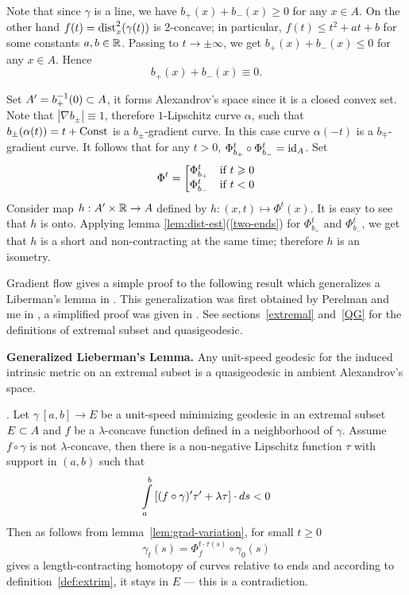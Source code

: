 \documentclass{article}
\begin{document}
Note that since $\gamma$ is a line, we have $b_+(x)+b_-(x)\ge0$ for any $x\in A$.
On the other hand $f(t)={\dist^2_x(\gamma(t))}$ is $2$-concave; in particular, $f(t)\le t^2+at+b$ for some constants $a,b\in\RR$. 
Passing to $t\to\pm\infty$, we get $b_+(x)+b_-(x)\le0$ for any $x\in A$.
Hence $$b_+(x)+b_-(x)\equiv 0.$$

Set $A'=b_+^{-1}(0)\i A$, it forms Alexandrov's space since it is a closed convex set.
Note that $|\nabla b_\pm|\equiv 1$, therefore $1$-Lipschitz curve $\alpha$, such that $b_\pm(\alpha(t))=t+\Const$ is a $b_\pm$-gradient curve. 
In this case curve $\alpha(-t)$ is a $b_\mp$-gradient curve.
It follows that for any $t>0$, $\Phi_{b_+}^t\circ\Phi_{b_-}^t=\id_A$.
Set
$$\Phi^t=\left[\begin{matrix}
\Phi_{b_+}^t&\hbox{if}\ t\ge0\\
\Phi_{b_-}^t&\hbox{if}\ t<0
               \end{matrix}\right.$$
Consider map $h:A'\times \RR\to A$ defined by $h:(x,t)\mapsto \Phi^t(x)$.
It is easy to see that $h$ is onto.
Applying lemma \ref{lem:dist-est}(\ref{two-ends}) for $\Phi_{b_+}^t$ and $\Phi_{b_-}^t$, we get that $h$ is a short and non-contracting at the same time; therefore $h$ is an isometry.\qeds

Gradient flow gives a simple proof to the following result which generalizes a Liberman's lemma in \cite{liberman}. 
This generalization was first obtained by Perelman and me in
\cite[5.3]{perelman-petrunin:extremal}, 
a simplified proof was given in
\cite[1.1]{petrunin:extremal}.
See sections~\ref{extremal} and~\ref{QG}  
for the definitions of extremal subset and
quasigeodesic. 

\begin{thm}{\bf Generalized Lieberman's Lemma.}\label{lib-lem} Any unit-speed geodesic for the
induced intrinsic metric on an extremal subset is a quasigeodesic in ambient Alexandrov's space.
\end{thm}


\Proof. Let $\gamma\:[a,b]\to E$ be a unit-speed minimizing geodesic in an extremal subset
$E\i A$ and $f$ be a $\lambda$-concave function defined in a neighborhood of
$\gamma$.
Assume $f\circ\gamma$ is not $\lambda$-concave, then there is a non-negative
Lipschitz function $\tau$ with support in $(a,b)$ such that
$$\int\limits_a^b\l[(f\circ\gamma)'\tau'+\lambda\tau\r]\cdot d s< 0$$
Then as follows from lemma~\ref{lem:grad-variation}, for small $t\ge 0$
$$\gamma_t(s)=\Phi^{t\cdot\tau(s)}_f \circ\gamma_0(s)$$
gives a length-contracting homotopy of curves relative to ends and according to
definition~\ref{def:extrim}, it stays in $E$ --- this is a contradiction.\qeds
\end{document}
